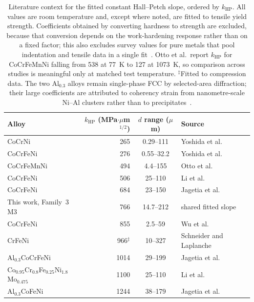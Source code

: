 \documentclass[a4paper,11pt]{article}
\begin{document}
\begin{table}[H]
\centering
\caption{Literature context for the fitted constant Hall--Petch slope, ordered by $k_{\mathrm{HP}}$. All values are room temperature and, except where noted, are fitted to tensile yield strength. Coefficients obtained by converting hardness to strength are excluded, because that conversion depends on the work-hardening response rather than on a fixed factor; this also excludes survey values for pure metals that pool indentation and tensile data in a single fit~\cite{Cordero2016}. Otto et al.\ report $k_{\mathrm{HP}}$ for CoCrFeMnNi falling from 538 at 77~K to 127 at 1073~K, so comparison across studies is meaningful only at matched test temperature. $^{\ddagger}$Fitted to compression data. The two Al$_{0.3}$ alloys remain single-phase FCC by selected-area diffraction; their large coefficients are attributed to coherency strain from nanometre-scale Ni--Al clusters rather than to precipitates~\cite{Jagetia2021}.}
\label{tab:khplit}
\small
\begin{tabular}{lrcl}
\toprule
Alloy & $k_{\mathrm{HP}}$ (MPa$\cdot\mu$m$^{1/2}$) & $d$ range ($\mu$m) & Source \\
\midrule
CoCrNi & 265 & 0.29--111 & Yoshida et al.~\cite{Yoshida2017} \\
CoCrFeNi & 276 & 0.55--32.2 & Yoshida et al.~\cite{Yoshida2019acta} \\
CoCrFeMnNi & 494 & 4.4--155 & Otto et al.~\cite{Otto2013} \\
CoCrFeNi & 506 & 25--110 & Li et al.~\cite{LiKHP2024} \\
CoCrFeNi & 684 & 23--150 & Jagetia et al.~\cite{Jagetia2021} \\
This work, Family~3 M3 & 766 & 14.7--212 & shared fitted slope \\
CoCrFeNi & 855 & 2.5--59 & Wu et al.~\cite{WuGaoBei2016} \\
CrFeNi & 966$^{\ddagger}$ & 10--327 & Schneider and Laplanche~\cite{SchneiderCrFeNi2021} \\
Al$_{0.3}$CoCrFeNi & 1014 & 29--199 & Jagetia et al.~\cite{Jagetia2021} \\
Co$_{0.95}$Cr$_{0.8}$Fe$_{0.25}$Ni$_{1.8}$Mo$_{0.475}$ & 1100 & 25--110 & Li et al.~\cite{LiKHP2024} \\
Al$_{0.3}$CoFeNi & 1244 & 38--179 & Jagetia et al.~\cite{Jagetia2021} \\
\bottomrule
\end{tabular}
\end{table}
\end{document}
